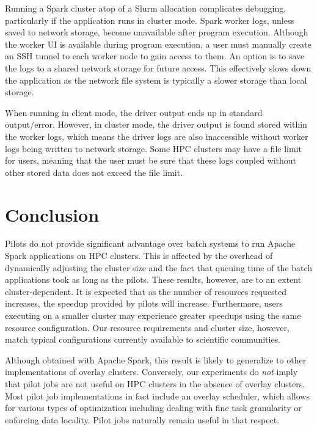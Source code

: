     Running a Spark cluster atop of a Slurm allocation complicates debugging,
    particularly if the application runs in cluster mode. Spark worker logs,
    unless saved to network storage, become unavailable after program execution.
    Although the worker UI is available during program execution, a user must
    manually create an SSH tunnel to each worker node to gain access to them. An
    option is to save the logs to a shared network storage for future access.
    This effectively slows down the application as the network file system is
    typically a slower storage than local storage.
    
    When running in client mode, the driver output ends up in standard
    output/error. However, in cluster mode, the driver output is found stored
    within the worker logs, which means the driver logs are also inaccessible
    without worker logs being written to network storage. Some HPC clusters may
    have a file limit for users, meaning that the user must be sure that these
    logs coupled without other stored data does not exceed the file limit.  
    
    \section{Conclusion}\label{spa:sec:conclusion} Pilots do not provide
    significant advantage over batch systems to run Apache Spark applications on
    HPC clusters. This is affected by the overhead of dynamically adjusting the
    cluster size and the fact that queuing time of the batch applications took
    as long as the pilots. These results, however, are to an extent
    cluster-dependent. It is expected that as the number of resources requested
    increases, the speedup provided by pilots will increase. Furthermore, users
    executing on a smaller cluster may experience greater speedups using the
    same resource configuration. Our resource requirements and cluster size,
    however, match typical configurations currently available to scientific
    communities.
    
    Although obtained with Apache Spark, this result is likely to generalize to
    other implementations of overlay clusters. Conversely, our experiments do
    \emph{not} imply that pilot jobs are not useful on HPC clusters in the
    absence of overlay clusters. Most pilot job implementations in fact include
    an overlay scheduler, which allows for various types of optimization
    including dealing with fine task granularity or enforcing data locality.
    Pilot jobs naturally remain useful in that respect.
    
